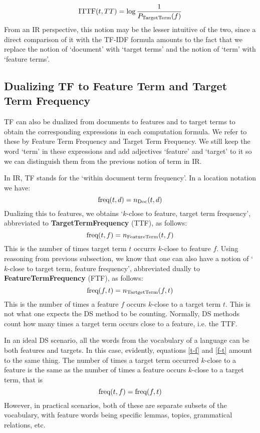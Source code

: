 \begin{equation}
\label{ittf}
 \textmd{ITTF}(t, TT) =  \log{\frac{1}{P_{\textmd{TargetTerm}}(f)}}
\end{equation}
From an IR perspective, this notion may be  the  lesser intuitive of the two, since a direct comparison of it  with the TF-IDF formula amounts to the fact that  we replace the notion of `document' with `target terms' and the notion of `term' with `feature terms'.

\subsection{Dualizing TF to Feature Term and Target Term Frequency}
\label{subsec-TF}

TF can also be dualized from documents to features and to target terms to obtain the corresponding expressions in each computation formula.  We refer to these by Feature Term Frequency and Target Term  Frequency. We still keep the  word `term'  in these expressions and add adjectives `feature' and `target'  to it so we can distinguish them from the previous notion of term in IR. 

In IR, TF stands for the `within document term frequency'. In a location notation we have:
\[
\textmd{freq}(t,d) = n_{\textmd{Doc}}(t,d)
\]
Dualizing this to features, we obtains `$k$-close to feature, target  term frequency', abbreviated to {\bf TargetTermFrequency} (TTF), as follows:
\begin{equation}
\label{t-f}
\textmd{freq}(t,f) = n_{\textmd{FeatureTerm}}(t,f)
\end{equation}
This is the number of times target  term $t$ occurrs $k$-close to feature $f$.  Using reasoning from previous subsection, we know that one can also have a notion of `$k$-close to target term, feature frequency', abbreviated dually to {\bf FeatureTermFrequency} (FTF), as follows:
\begin{equation}
\label{f-t}
\textmd{freq}(f,t) = n_{\textmd{TartgetTerm}}(f,t)
\end{equation}
This is the number of times a feature $f$ occurs $k$-close to a target term $t$.  This is not what one expects the DS method to be counting. Normally, DS methods count how many times a target term occurs close to a feature, i.e. the TTF. 

In an ideal DS scenario, all the words from the vocabulary of a language can be both features and targets. In this case, evidently, equations \ref{t-f} and \ref{f-t} amount to the same thing. The number of times a target term occurred $k$-close to a feature is the same as the number of times a feature occurs $k$-close to a target term, that is
\begin{equation}
\label{ttf=ftf}
\textmd{freq}(t,f) = \textmd{freq}(f,t) 
\end{equation}
However, in practical scenarios, both of these are separate subsets of the vocabulary, with feature words being specific lemmas, topics, grammatical relations, etc. 

